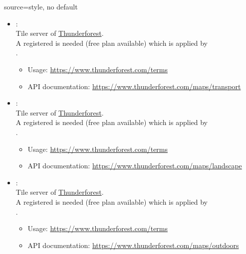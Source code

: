 \begin{docMrcKey}[supply]{source}{=}{style, no default}
\begin{itemize}
\clearpage
  \item{}:\\
    Tile server of \href{https://www.thunderforest.com}{Thunderforest}.\\
    A registered  is needed (free plan available)
    which is applied by\\
    .
    \begin{itemize}
    \item Usage: \url{https://www.thunderforest.com/terms}
    \item API documentation: \url{https://www.thunderforest.com/maps/transport}
    \end{itemize}

  \item{}:\\
    Tile server of \href{https://www.thunderforest.com}{Thunderforest}.\\
    A registered  is needed (free plan available)
    which is applied by\\
    .
    \begin{itemize}
    \item Usage: \url{https://www.thunderforest.com/terms}
    \item API documentation: \url{https://www.thunderforest.com/maps/landscape}
    \end{itemize}

  \item{}:\\
    Tile server of \href{https://www.thunderforest.com}{Thunderforest}.\\
    A registered  is needed (free plan available)
    which is applied by\\
    .
    \begin{itemize}
    \item Usage: \url{https://www.thunderforest.com/terms}
    \item API documentation: \url{https://www.thunderforest.com/maps/outdoors}
    \end{itemize}


\end{itemize}
\end{docMrcKey}
